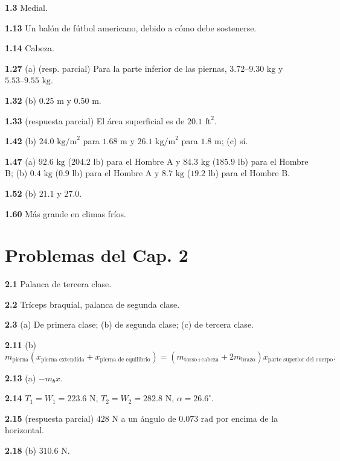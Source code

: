 \documentclass[12pt,a4paper]{book}
\begin{document}
\noindent \textbf{1.3} Medial.

\noindent \textbf{1.13} Un balón de fútbol americano, debido a cómo debe sostenerse.

\noindent \textbf{1.14} Cabeza.

\noindent \textbf{1.27} (a) (resp. parcial) Para la parte inferior de las piernas, $3.72\text{--}9.30\text{ kg}$ y $5.53\text{--}9.55\text{ kg}$.

\noindent \textbf{1.32} (b) $0.25\text{ m}$ y $0.50\text{ m}$.

\noindent \textbf{1.33} (respuesta parcial) El área superficial es de $20.1\text{ ft}^2$.

\noindent \textbf{1.42} (b) $24.0\text{ kg/m}^2$ para $1.68\text{ m}$ y $26.1\text{ kg/m}^2$ para $1.8\text{ m}$; (c) sí.

\noindent \textbf{1.47} (a) $92.6\text{ kg}$ ($204.2\text{ lb}$) para el Hombre A y $84.3\text{ kg}$ ($185.9\text{ lb}$) para el Hombre B; (b) $0.4\text{ kg}$ ($0.9\text{ lb}$) para el Hombre A y $8.7\text{ kg}$ ($19.2\text{ lb}$) para el Hombre B.

\noindent \textbf{1.52} (b) $21.1$ y $27.0$.

\noindent \textbf{1.60} Más grande en climas fríos.

\section*{Problemas del Cap. 2}

\noindent \textbf{2.1} Palanca de tercera clase.

\noindent \textbf{2.2} Tríceps braquial, palanca de segunda clase.

\noindent \textbf{2.3} (a) De primera clase; (b) de segunda clase; (c) de tercera clase.

\noindent \textbf{2.11} (b)
\[
m_{\text{pierna}}(x_{\text{pierna extendida}} + x_{\text{pierna de equilibrio}}) = (m_{\text{torso}+\text{cabeza}} + 2m_{\text{brazo}})x_{\text{parte superior del cuerpo}}.
\]

\noindent \textbf{2.13} (a) $-m_b x$.

\noindent \textbf{2.14} $T_1 = W_1 = 223.6\text{ N}$, $T_2 = W_2 = 282.8\text{ N}$, $\alpha = 26.6^\circ$.

\noindent \textbf{2.15} (respuesta parcial) $428\text{ N}$ a un ángulo de $0.073\text{ rad}$ por encima de la horizontal.

\noindent \textbf{2.18} (b) $310.6\text{ N}$.
\end{document}
